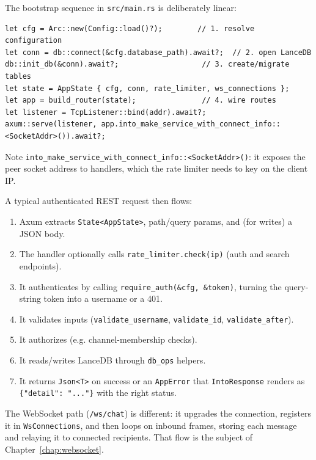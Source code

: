 The bootstrap sequence in \verb|src/main.rs| is deliberately linear:

\begin{lstlisting}
let cfg = Arc::new(Config::load()?);        // 1. resolve configuration
let conn = db::connect(&cfg.database_path).await?;  // 2. open LanceDB
db::init_db(&conn).await?;                   // 3. create/migrate tables
let state = AppState { cfg, conn, rate_limiter, ws_connections };
let app = build_router(state);               // 4. wire routes
let listener = TcpListener::bind(addr).await?;
axum::serve(listener, app.into_make_service_with_connect_info::<SocketAddr>()).await?;
\end{lstlisting}

Note \verb|into_make_service_with_connect_info::<SocketAddr>()|: it exposes the
peer socket address to handlers, which the rate limiter needs to key on the
client IP.

A typical authenticated REST request then flows:

\begin{enumerate}
  \item Axum extracts \verb|State<AppState>|, path/query params, and (for writes)
        a JSON body.
  \item The handler optionally calls \verb|rate_limiter.check(ip)| (auth and
        search endpoints).
  \item It authenticates by calling \verb|require_auth(&cfg, &token)|, turning
        the query-string token into a username or a 401.
  \item It validates inputs (\verb|validate_username|, \verb|validate_id|,
        \verb|validate_after|).
  \item It authorizes (e.g. channel-membership checks).
  \item It reads/writes LanceDB through \verb|db_ops| helpers.
  \item It returns \verb|Json<T>| on success or an \verb|AppError| that
        \verb|IntoResponse| renders as \verb|{"detail": "..."}| with the right
        status.
\end{enumerate}

The WebSocket path (\verb|/ws/chat|) is different: it upgrades the connection,
registers it in \verb|WsConnections|, and then loops on inbound frames, storing
each message and relaying it to connected recipients. That flow is the subject of
Chapter~\ref{chap:websocket}.
